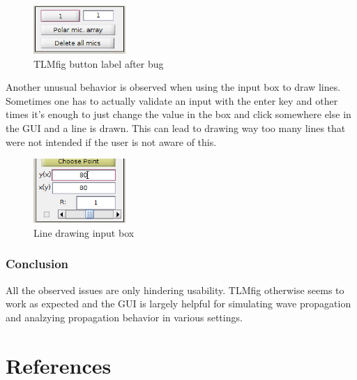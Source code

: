 \documentclass[twocolumn]{article}
\begin{document}
\begin{figure}[H]
    \centering
    \includegraphics[width=35mm]{./Images/tlm_fig_button_label_bad.png}
    \caption{TLMfig button label after bug}
\end{figure}

Another unusual behavior is observed when using the input box to draw lines.
Sometimes one has to actually validate an input with the enter key and other times
it's enough to just change the value in the box and click somewhere else in the GUI
and a line is drawn.
This can lead to drawing way too many lines that were not intended if the user is not
aware of this.

\begin{figure}[H]
    \centering
    \includegraphics[width=35mm]{./Images/tlm_fig_updating_lines.png}
    \caption{Line drawing input box}
\end{figure}

\subsubsection{Conclusion}
All the observed issues are only hindering usability.
TLMfig otherwise seems to work as expected and the GUI is largely helpful
for simulating wave propagation and analzying propagation behavior in
various settings.


\section{References}

\small


\end{document}
